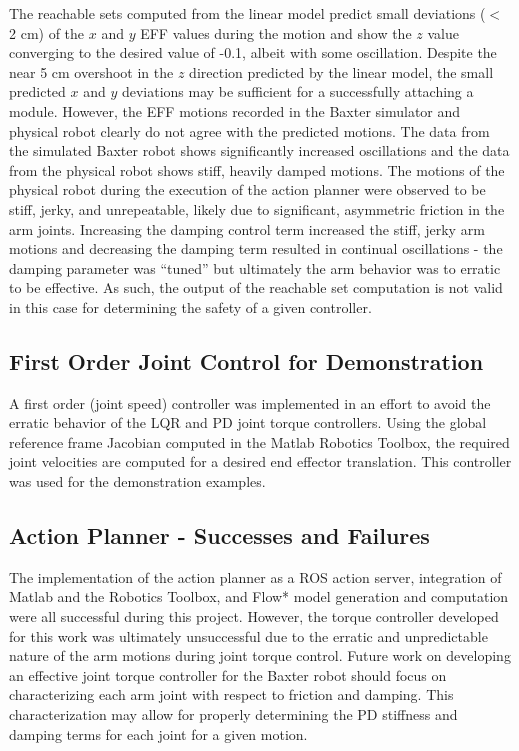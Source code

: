 The reachable sets computed from the linear model predict small deviations ($<$ 2 cm) of the $x$ and $y$ EFF values during the motion and show the $z$ value converging to the desired value of -0.1, albeit with some oscillation.
Despite the near 5 cm overshoot in the $z$ direction predicted by the linear model, the small predicted $x$ and $y$ deviations may be sufficient for a successfully attaching a module.
However, the EFF motions recorded in the Baxter simulator and physical robot clearly do not agree with the predicted motions.
The data from the simulated Baxter robot shows significantly increased oscillations and the data from the physical robot shows stiff, heavily damped motions.
The motions of the physical robot during the execution of the action planner were observed to be stiff, jerky, and unrepeatable, likely due to significant, asymmetric friction in the arm joints.
Increasing the damping control term increased the stiff, jerky arm motions and decreasing the damping term resulted in continual oscillations - the damping parameter was ``tuned'' but ultimately the arm behavior was to erratic to be effective.
As such, the output of the reachable set computation is not valid in this case for determining the safety of a given controller.


\subsection{First Order Joint Control for Demonstration}
A first order (joint speed) controller was implemented in an effort to avoid the erratic behavior of the LQR and PD joint torque controllers.
Using the global reference frame Jacobian computed in the Matlab Robotics Toolbox, the required joint velocities are computed for a desired end effector translation.
This controller was used for the demonstration examples.

\subsection{Action Planner - Successes and Failures}
The implementation of the action planner as a ROS action server, integration of Matlab and the Robotics Toolbox, and Flow* model generation and computation were all successful during this project.
However, the torque controller developed for this work was ultimately unsuccessful due to the erratic and unpredictable nature of the arm motions during joint torque control.
Future work on developing an effective joint torque controller for the Baxter robot should focus on characterizing each arm joint with respect to friction and damping.
This characterization may allow for properly determining the PD stiffness and damping terms for each joint for a given motion.

